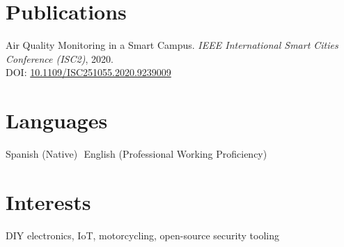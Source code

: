 \documentclass[11pt,a4paper]{article}
\newcommand{\sep}{\,\textbar\,}
\begin{document}
\section*{Publications}
Air Quality Monitoring in a Smart Campus. \emph{IEEE International Smart Cities Conference (ISC2)}, 2020.\\
DOI: \href{https://doi.org/10.1109/ISC251055.2020.9239009}{10.1109/ISC251055.2020.9239009}

\section*{Languages}
Spanish (Native) \sep English (Professional Working Proficiency)

\section*{Interests}
DIY electronics, IoT, motorcycling, open-source security tooling
\end{document}

